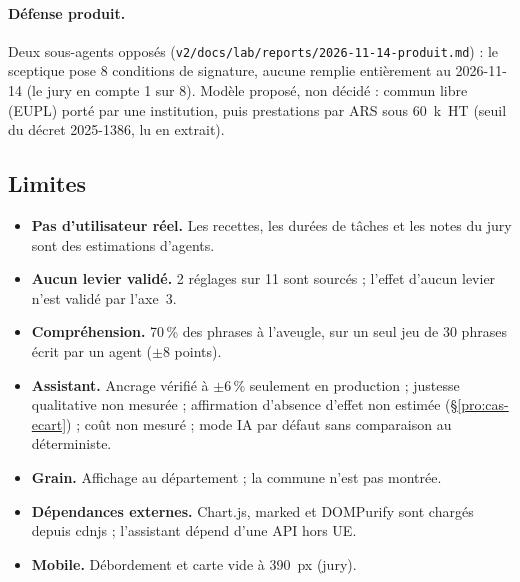 \paragraph{Défense produit.}
Deux sous-agents opposés (\texttt{v2/\allowbreak{}docs/\allowbreak{}lab/\allowbreak{}reports/\allowbreak{}2026-\allowbreak{}11-\allowbreak{}14-\allowbreak{}produit.md}) : le sceptique pose 8\mesure{} conditions de signature, aucune remplie entièrement au 2026-11-14 (le jury en compte 1\suppose{} sur 8).
Modèle proposé, non décidé : commun libre (EUPL) porté par une institution, puis prestations par ARS sous 60\suppose{}~k\texteuro{}~HT (seuil du décret 2025-1386, lu en extrait).

\subsection{Limites}\label{pro:limites}

\begin{itemize}
\item \textbf{Pas d'utilisateur réel.} Les recettes, les durées de tâches et les notes du jury sont des estimations d'agents.
\item \textbf{Aucun levier validé.} 2\mesure{} réglages sur 11 sont sourcés ; l'effet d'aucun levier n'est validé par l'axe~3.
\item \textbf{Compréhension.} 70\mesure{}\,\% des phrases à l'aveugle, sur un seul jeu de 30\mesure{} phrases écrit par un agent ($\pm8$\derive{} points).
\item \textbf{Assistant.} Ancrage vérifié à $\pm6$\mesure{}\,\% seulement en production ; justesse qualitative non mesurée ; affirmation d'absence d'effet non estimée (§\ref{pro:cas-ecart}) ; coût non mesuré ; mode IA par défaut sans comparaison au déterministe.
\item \textbf{Grain.} Affichage au département ; la commune n'est pas montrée.
\item \textbf{Dépendances externes.} Chart.js, marked et DOMPurify sont chargés depuis cdnjs ; l'assistant dépend d'une API hors UE.
\item \textbf{Mobile.} Débordement et carte vide à 390\mesure{}~px (jury).
\end{itemize}
\endgroup
